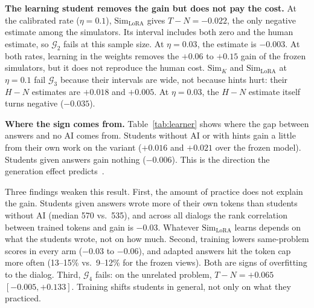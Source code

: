 \documentclass{article} %
\newcommand{\simK}{\ensuremath{\text{Sim}_K}}
\newcommand{\simL}{\ensuremath{\text{Sim}_{\text{LoRA}}}}
\newcommand{\gate}[1]{\ensuremath{\mathcal{G}_{#1}}}
\begin{document}
\textbf{The learning student removes the gain but does not pay the cost.} At the calibrated rate ($\eta=0.1$), \simL{} gives $T-N=-0.022$, the only negative estimate among the simulators. Its interval includes both zero and the human estimate, so \gate{2} fails at this sample size. At $\eta=0.03$, the estimate is $-0.003$. At both rates, learning in the weights removes the $+0.06$ to $+0.15$ gain of the frozen simulators, but it does not reproduce the human cost. \simK{} and \simL{} at $\eta=0.1$ fail \gate{3} because their intervals are wide, not because hints hurt: their $H-N$ estimates are $+0.018$ and $+0.005$. At $\eta=0.03$, the $H-N$ estimate itself turns negative ($-0.035$).

\begin{table}[t]
\centering
\caption{What \simL{} learned: the adapted student minus the frozen model on the same tests (95\% CI), at learning rate 0.1. Trained tokens and loss drops are medians over dialogs.}
\label{tab:learner}
\small
{}
\end{table}

\textbf{Where the sign comes from.} Table~\ref{tab:learner} shows where the gap between answers and no AI comes from. Students without AI or with hints gain a little from their own work on the variant ($+0.016$ and $+0.021$ over the frozen model). Students given answers gain nothing ($-0.006$). This is the direction the generation effect predicts~\citep{slamecka1978generation}.

Three findings weaken this result. First, the amount of practice does not explain the gain. Students given answers wrote more of their own tokens than students without AI (median 570 vs.\ 535), and across all dialogs the rank correlation between trained tokens and gain is $-0.03$. Whatever \simL{} learns depends on what the students wrote, not on how much. Second, training lowers same-problem scores in every arm ($-0.03$ to $-0.06$), and adapted answers hit the token cap more often (13--15\% vs.\ 9--12\% for the frozen views). Both are signs of overfitting to the dialog. Third, \gate{4} fails: on the unrelated problem, $T-N=+0.065$ $[-0.005,+0.133]$. Training shifts students in general, not only on what they practiced.
\end{document}
